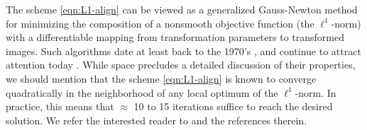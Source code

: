 \documentclass[12pt,journal,draftcls,letterpaper,onecolumn]{IEEEtran}
\begin{document}
The scheme \eqref{eqn:L1-align} can be viewed as a generalized Gauss-Newton method for minimizing the composition of a nonsmooth objective function (the $\ell^1$-norm) with a differentiable mapping from transformation parameters to transformed images. Such algorithms date at least back to the 1970's  \cite{Cromme1978-NM,Jittorntrum1980-NM}, and continue to attract attention today \cite{Lewis2008-TR}. While space precludes a detailed discussion of their properties, we should mention that the scheme \eqref{eqn:L1-align} is known to converge quadratically in the neighborhood of any local optimum of the $\ell^1$-norm. In practice, this means that $\approx$ 10 to 15 iterations suffice to reach the desired solution. We refer the interested reader to \cite{Jittorntrum1980-NM,Osborne1990-JAMSSB} and the references therein.
\end{document}
